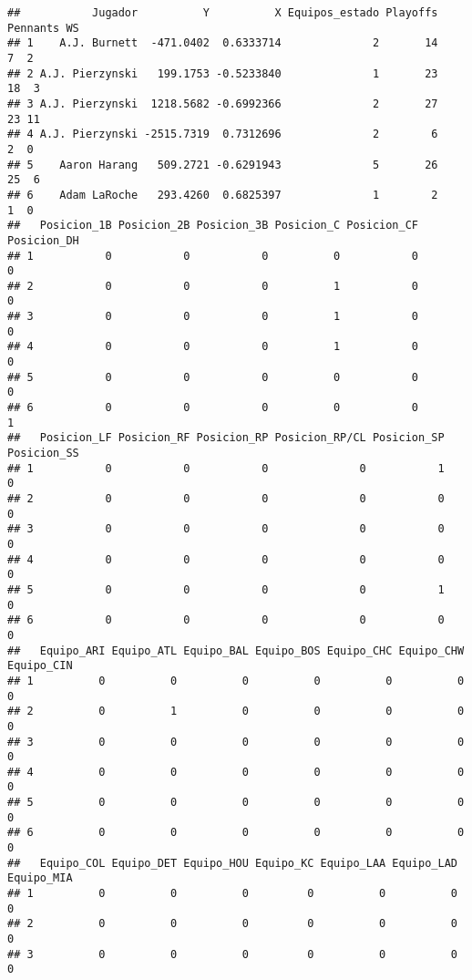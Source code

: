 \documentclass[
]{article}
\begin{document}
\begin{verbatim}
##           Jugador          Y          X Equipos_estado Playoffs Pennants WS
## 1    A.J. Burnett  -471.0402  0.6333714              2       14        7  2
## 2 A.J. Pierzynski   199.1753 -0.5233840              1       23       18  3
## 3 A.J. Pierzynski  1218.5682 -0.6992366              2       27       23 11
## 4 A.J. Pierzynski -2515.7319  0.7312696              2        6        2  0
## 5    Aaron Harang   509.2721 -0.6291943              5       26       25  6
## 6    Adam LaRoche   293.4260  0.6825397              1        2        1  0
##   Posicion_1B Posicion_2B Posicion_3B Posicion_C Posicion_CF Posicion_DH
## 1           0           0           0          0           0           0
## 2           0           0           0          1           0           0
## 3           0           0           0          1           0           0
## 4           0           0           0          1           0           0
## 5           0           0           0          0           0           0
## 6           0           0           0          0           0           1
##   Posicion_LF Posicion_RF Posicion_RP Posicion_RP/CL Posicion_SP Posicion_SS
## 1           0           0           0              0           1           0
## 2           0           0           0              0           0           0
## 3           0           0           0              0           0           0
## 4           0           0           0              0           0           0
## 5           0           0           0              0           1           0
## 6           0           0           0              0           0           0
##   Equipo_ARI Equipo_ATL Equipo_BAL Equipo_BOS Equipo_CHC Equipo_CHW Equipo_CIN
## 1          0          0          0          0          0          0          0
## 2          0          1          0          0          0          0          0
## 3          0          0          0          0          0          0          0
## 4          0          0          0          0          0          0          0
## 5          0          0          0          0          0          0          0
## 6          0          0          0          0          0          0          0
##   Equipo_COL Equipo_DET Equipo_HOU Equipo_KC Equipo_LAA Equipo_LAD Equipo_MIA
## 1          0          0          0         0          0          0          0
## 2          0          0          0         0          0          0          0
## 3          0          0          0         0          0          0          0

\end{verbatim}
\end{document}
